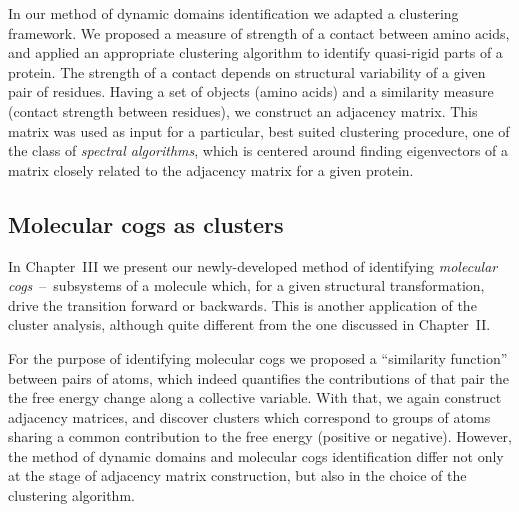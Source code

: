 In our method of dynamic domains identification we adapted a clustering framework.
We proposed a measure of strength of a contact between amino acids, and applied an appropriate clustering algorithm to identify quasi-rigid parts of a protein.
The strength of a contact depends on structural variability of a given pair of residues.
Having a set of objects (amino acids) and a similarity measure (contact strength between residues), we construct an adjacency matrix.
This matrix was used as input for a particular, best suited clustering procedure, one of the class of \emph{spectral algorithms}, which is centered around finding eigenvectors of a matrix closely related to the adjacency matrix for a given protein.

\subsection{Molecular cogs as clusters}

In Chapter~III we present our newly-developed method of identifying \emph{molecular cogs}~--~subsystems of a molecule which, for a given structural transformation, drive the transition forward or backwards.
This is another application of the cluster analysis, although quite different from the one discussed in Chapter~II.

For the purpose of identifying molecular cogs we proposed a ``similarity function'' between pairs of atoms, which indeed quantifies the contributions of that pair the the free energy change along a collective variable.
With that, we again construct adjacency matrices, and discover clusters which correspond to groups of atoms sharing a common contribution to the free energy (positive or negative).
However, the method of dynamic domains and molecular cogs identification differ not only at the stage of adjacency matrix construction, but also in the choice of the clustering algorithm.
